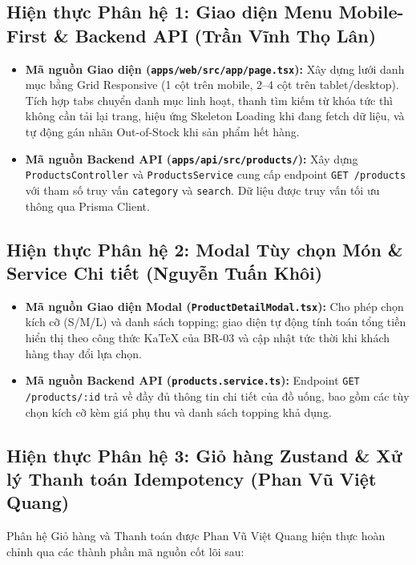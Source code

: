 \documentclass[a4paper]{article}
\begin{document}
\subsection{Hiện thực Phân hệ 1: Giao diện Menu Mobile-First \& Backend API (Trần Vĩnh Thọ Lân)}
\begin{itemize}
    \item \textbf{Mã nguồn Giao diện (\texttt{apps/web/src/app/page.tsx}):}
    Xây dựng lưới danh mục bằng Grid Responsive (1 cột trên mobile, 2--4 cột trên tablet/desktop). Tích hợp tabs chuyển danh mục linh hoạt, thanh tìm kiếm từ khóa tức thì không cần tải lại trang, hiệu ứng Skeleton Loading khi đang fetch dữ liệu, và tự động gán nhãn Out-of-Stock khi sản phẩm hết hàng.
    \item \textbf{Mã nguồn Backend API (\texttt{apps/api/src/products/}):}
    Xây dựng \texttt{ProductsController} và \texttt{ProductsService} cung cấp endpoint \texttt{GET /products} với tham số truy vấn \texttt{category} và \texttt{search}. Dữ liệu được truy vấn tối ưu thông qua Prisma Client.
\end{itemize}

\subsection{Hiện thực Phân hệ 2: Modal Tùy chọn Món \& Service Chi tiết (Nguyễn Tuấn Khôi)}
\begin{itemize}
    \item \textbf{Mã nguồn Giao diện Modal (\texttt{ProductDetailModal.tsx}):}
    Cho phép chọn kích cỡ (S/M/L) và danh sách topping; giao diện tự động tính toán tổng tiền hiển thị theo công thức KaTeX của BR-03 và cập nhật tức thời khi khách hàng thay đổi lựa chọn.
    \item \textbf{Mã nguồn Backend API (\texttt{products.service.ts}):}
    Endpoint \texttt{GET /products/:id} trả về đầy đủ thông tin chi tiết của đồ uống, bao gồm các tùy chọn kích cỡ kèm giá phụ thu và danh sách topping khả dụng.
\end{itemize}

\subsection{Hiện thực Phân hệ 3: Giỏ hàng Zustand \& Xử lý Thanh toán Idempotency (Phan Vũ Việt Quang)}
Phân hệ Giỏ hàng và Thanh toán được Phan Vũ Việt Quang hiện thực hoàn chỉnh qua các thành phần mã nguồn cốt lõi sau:
\end{document}
